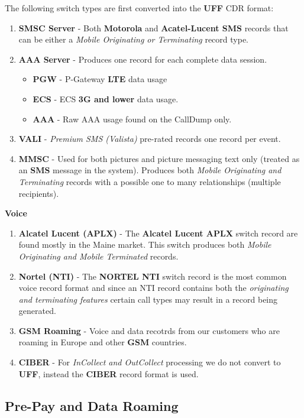 \documentclass[12pt,twoside]{article}
\begin{document}
    The following switch types are first converted into the \textbf{UFF} CDR format:\\
\begin{enumerate}
\item \textbf{SMSC Server} - Both \textbf{Motorola} and \textbf{Acatel-Lucent SMS} records that can be either a \emph{Mobile Originating or Terminating} record type.
\item \textbf{AAA Server} - Produces one record for each complete data session.
\begin{itemize}
\item \textbf{PGW} - P-Gateway \textbf{LTE} data usage
\item \textbf{ECS} - ECS \textbf{3G and lower} data usage.
\item \textbf{AAA} - Raw AAA usage found on the CallDump only.
\end{itemize}
\item \textbf{VALI} - \emph{Premium SMS (Valista)} pre-rated records one record per event.
\item \textbf{MMSC} - Used for both pictures and picture messaging text only (treated as an \textbf{SMS} message in the system). Produces both \emph{Mobile Originating and Terminating} records with a possible one to many relationships (multiple recipients). \\
\end{enumerate}
    \textbf{Voice}
\begin{enumerate}
\item \textbf{Alcatel Lucent (APLX)} - The \textbf{Alcatel Lucent APLX} switch record are found mostly in the Maine market. This switch produces both \emph{Mobile Originating and Mobile Terminated} records.
\item \textbf{Nortel (NTI)} - The \textbf{NORTEL NTI} switch record is the most common voice record format and since an NTI record contains both the \emph{originating and terminating features} certain call types may result in a record being generated.
\item \textbf{GSM Roaming} - Voice and data recotrds from our customers who are roaming in Europe and other \textbf{GSM} countries.
\item \textbf{CIBER} - For \emph{InCollect and OutCollect} processing we do not convert to \textbf{UFF}, instead the \textbf{CIBER} record format is used.
\end{enumerate}
\subsection{Pre-Pay and Data Roaming}
\label{sec-2-2}
\end{document}
